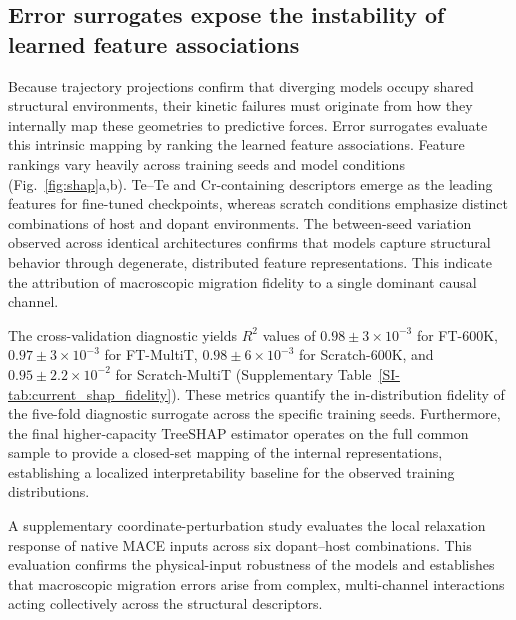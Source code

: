 \documentclass[pdflatex,sn-mathphys-num]{sn-jnl}
\newcommand{\sitab}[1]{Supplementary Table~\ref{SI-#1}}
\begin{document}
\FloatBarrier
\subsection{Error surrogates expose the instability of learned feature associations}\label{sec:shap}

Because trajectory projections confirm that diverging models occupy shared structural environments, their kinetic failures must originate from how they internally map these geometries to predictive forces. Error surrogates evaluate this intrinsic mapping by ranking the learned feature associations. Feature rankings vary heavily across training seeds and model conditions (Fig.~\ref{fig:shap}a,b). Te--Te and Cr-containing descriptors emerge as the leading features for fine-tuned checkpoints, whereas scratch conditions emphasize distinct combinations of host and dopant environments. The between-seed variation observed across identical architectures confirms that models capture structural behavior through degenerate, distributed feature representations. This indicate the attribution of macroscopic migration fidelity to a single dominant causal channel.

The cross-validation diagnostic yields $R^2$ values of $0.98\pm3\times10^{-3}$ for FT-600K, $0.97\pm3\times10^{-3}$ for FT-MultiT, $0.98\pm6\times10^{-3}$ for Scratch-600K, and $0.95\pm2.2\times10^{-2}$ for Scratch-MultiT (\sitab{tab:current_shap_fidelity}). These metrics quantify the in-distribution fidelity of the five-fold diagnostic surrogate across the specific training seeds. Furthermore, the final higher-capacity TreeSHAP estimator operates on the full common sample to provide a closed-set mapping of the internal representations, establishing a localized interpretability baseline for the observed training distributions.

A supplementary coordinate-perturbation study evaluates the local relaxation response of native MACE inputs across six dopant--host combinations. This evaluation confirms the physical-input robustness of the models and establishes that macroscopic migration errors arise from complex, multi-channel interactions acting collectively across the structural descriptors.
\end{document}
